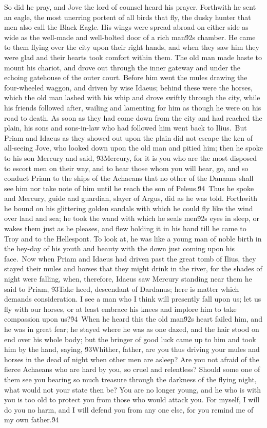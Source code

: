 {So did he pray, and Jove the lord of counsel heard his prayer. Forthwith he sent an eagle, the most unerring portent of all birds that fly, the dusky hunter that men also call the Black Eagle. His wings were spread abroad on either side as wide as the well-made and well-bolted door of a rich man\'92s chamber. He came to them flying over the city upon their right hands, and when they saw him they were glad and their hearts took comfort within them. The old man made haste to mount his chariot, and drove out through the inner gateway and under the echoing gatehouse of the outer court. Before him went the mules drawing the four-wheeled waggon, and driven by wise Idaeus; behind these were the horses, which the old man lashed with his whip and drove swiftly through the city, while his friends followed after, wailing and lamenting for him as though he were on his road to death. As soon as they had come down from the city and had reached the plain, his sons and sons-in-law who had followed him went back to Ilius.\
But Priam and Idaeus as they showed out upon the plain did not escape the ken of all-seeing Jove, who looked down upon the old man and pitied him; then he spoke to his son Mercury and said, \'93Mercury, for it is you who are the most disposed to escort men on their way, and to hear those whom you will hear, go, and so conduct Priam to the ships of the Achaeans that no other of the Danaans shall see him nor take note of him until he reach the son of Peleus.\'94\
Thus he spoke and Mercury, guide and guardian, slayer of Argus, did as he was told. Forthwith he bound on his glittering golden sandals with which he could fly like the wind over land and sea; he took the wand with which he seals men\'92s eyes in sleep, or wakes them just as he pleases, and flew holding it in his hand till he came to Troy and to the Hellespont. To look at, he was like a young man of noble birth in the hey-day of his youth and beauty with the down just coming upon his face.\
Now when Priam and Idaeus had driven past the great tomb of Ilius, they stayed their mules and horses that they might drink in the river, for the shades of night were falling, when, therefore, Idaeus saw Mercury standing near them he said to Priam, \'93Take heed, descendant of Dardanus; here is matter which demands consideration. I see a man who I think will presently fall upon us; let us fly with our horses, or at least embrace his knees and implore him to take compassion upon us?\'94\
When he heard this the old man\'92s heart failed him, and he was in great fear; he stayed where he was as one dazed, and the hair stood on end over his whole body; but the bringer of good luck came up to him and took him by the hand, saying, \'93Whither, father, are you thus driving your mules and horses in the dead of night when other men are asleep? Are you not afraid of the fierce Achaeans who are hard by you, so cruel and relentless? Should some one of them see you bearing so much treasure through the darkness of the flying night, what would not your state then be? You are no longer young, and he who is with you is too old to protect you from those who would attack you. For myself, I will do you no harm, and I will defend you from any one else, for you remind me of my own father.\'94\
}
